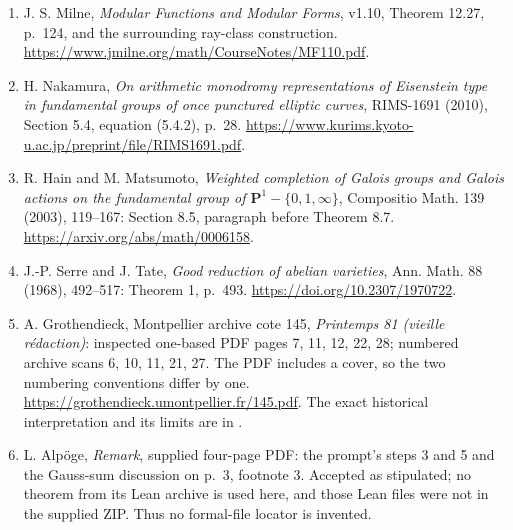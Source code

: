 \documentclass[11pt]{article}
\begin{document}
\begin{enumerate}
\url{https://www.jmilne.org/math/CourseNotes/LEC.pdf}.
\item J. S. Milne, \emph{Modular Functions and Modular Forms},
v1.10, Theorem 12.27, p.~124, and the surrounding ray-class
construction. \url{https://www.jmilne.org/math/CourseNotes/MF110.pdf}.
\item H. Nakamura, \emph{On arithmetic monodromy representations
of Eisenstein type in fundamental groups of once punctured
elliptic curves}, RIMS-1691 (2010), Section 5.4, equation
(5.4.2), p.~28.
\url{https://www.kurims.kyoto-u.ac.jp/preprint/file/RIMS1691.pdf}.
\item R. Hain and M. Matsumoto, \emph{Weighted completion of
Galois groups and Galois actions on the fundamental group of
$\mathbf P^1-\{0,1,\infty\}$}, Compositio Math. 139 (2003),
119--167: Section 8.5, paragraph before Theorem 8.7.
\url{https://arxiv.org/abs/math/0006158}.
\item J.-P. Serre and J. Tate, \emph{Good reduction of abelian
varieties}, Ann. Math. 88 (1968), 492--517: Theorem 1, p.~493.
\url{https://doi.org/10.2307/1970722}.
\item A. Grothendieck, Montpellier archive cote 145,
\emph{Printemps 81 (vieille r\'edaction)}: inspected one-based
PDF pages 7, 11, 12, 22, 28; numbered archive scans
6, 10, 11, 21, 27.  The PDF includes a cover, so the two
numbering conventions differ by one.
\url{https://grothendieck.umontpellier.fr/145.pdf}.
The exact historical interpretation and its limits are in
.
\item L. Alp\"oge, \emph{Remark}, supplied four-page PDF:
the prompt's steps 3 and 5 and the Gauss-sum discussion on
p.~3, footnote 3.  Accepted as stipulated; no theorem from
its Lean archive is used here, and those Lean files were not
in the supplied ZIP.  Thus no formal-file locator is invented.
\end{enumerate}
\end{document}
